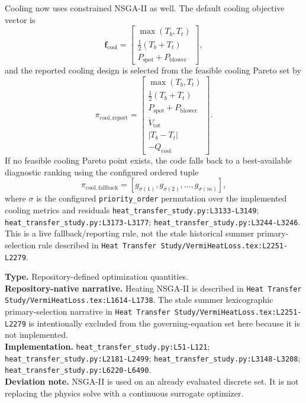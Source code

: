 \documentclass[11pt]{article}
\newcommand{\srcref}[1]{\nolinkurl{#1}}
\newcommand{\filepath}[1]{\nolinkurl{#1}}
\newcommand{\code}[1]{\nolinkurl{#1}}
\begin{document}
Cooling now uses constrained NSGA-II as well. The default cooling objective vector is
\begin{equation}
\label{eq:cooling_objective_vector}
\mathbf{f}_{\mathrm{cool}}=
\begin{bmatrix}
\max(T_b,T_t)\\
\tfrac{1}{2}(T_b+T_t)\\
P_{\mathrm{spot}}+P_{\mathrm{blower}}
\end{bmatrix},
\end{equation}
and the reported cooling design is selected from the feasible cooling Pareto set by
\begin{equation}
\label{eq:cooling_report_selection}
\pi_{\mathrm{cool,report}}=
\begin{bmatrix}
\max(T_b,T_t)\\
\tfrac{1}{2}(T_b+T_t)\\
P_{\mathrm{spot}}+P_{\mathrm{blower}}\\
\dot V_{\mathrm{tot}}\\
|T_b-T_t|\\
-Q_{\mathrm{cool}}
\end{bmatrix}.
\end{equation}
If no feasible cooling Pareto point exists, the code falls back to a best-available diagnostic ranking using the configured ordered tuple
\begin{equation}
\label{eq:cooling_fallback_selection}
\pi_{\mathrm{cool,fallback}}=
\left[
g_{\sigma(1)},g_{\sigma(2)},\dots,g_{\sigma(m)}
\right],
\end{equation}
where \(\sigma\) is the configured \code{priority\_order} permutation over the implemented cooling metrics and residuals \srcref{heat_transfer_study.py:L3133-L3149}; \srcref{heat_transfer_study.py:L3173-L3177}; \srcref{heat_transfer_study.py:L3244-L3246}. This is a live fallback/reporting rule, not the stale historical summer primary-selection rule described in \filepath{Heat Transfer Study/VermiHeatLoss.tex:L2251-L2279}.

\textbf{Type.} Repository-defined optimization quantities. \\
\textbf{Repository-native narrative.} Heating NSGA-II is described in \filepath{Heat Transfer Study/VermiHeatLoss.tex:L1614-L1738}. The stale summer lexicographic primary-selection narrative in \filepath{Heat Transfer Study/VermiHeatLoss.tex:L2251-L2279} is intentionally excluded from the governing-equation set here because it is not implemented. \\
\textbf{Implementation.} \srcref{heat_transfer_study.py:L51-L121}; \srcref{heat_transfer_study.py:L2181-L2499}; \srcref{heat_transfer_study.py:L3148-L3208}; \srcref{heat_transfer_study.py:L6220-L6490}. \\
\textbf{Deviation note.} NSGA-II is used on an already evaluated discrete set. It is not replacing the physics solve with a continuous surrogate optimizer.
\end{document}

